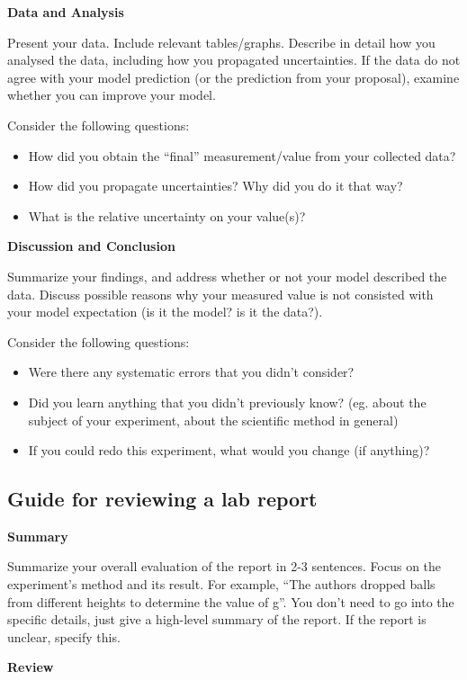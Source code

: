\textbf{Data and Analysis}

Present your data. Include relevant tables/graphs. Describe in detail how you analysed the data, including how you propagated uncertainties. If the data do not agree with your model prediction (or the prediction from your proposal), examine whether you can improve your model. 

Consider the following questions:
\begin{itemize}
\item How did you obtain the ``final'' measurement/value from your collected data? 
\item How did you propagate uncertainties? Why did you do it that way?
\item What is the relative uncertainty on your value(s)?
\end{itemize}

\textbf{Discussion and Conclusion}

Summarize your findings, and address whether or not your model described the data. Discuss possible reasons why your measured value is not consisted with your model expectation (is it the model? is it the data?).

Consider the following questions:
\begin{itemize}
\item Were there any systematic errors that you didn't consider?
\item Did you learn anything that you didn't previously know? (eg. about the subject of your experiment, about the scientific method in general)
\item If you could redo this experiment, what would you change (if anything)?
\end{itemize}

\newpage
\subsection{Guide for reviewing a lab report}
 \vspace{0.25cm}
\textbf{Summary}

Summarize your overall evaluation of the report in 2-3 sentences. Focus on the experiment's method and its result. For example, ``The authors dropped balls from different heights to determine the value of g''. You don't need to go into the specific details, just give a high-level summary of the report. If the report is unclear, specify this.

\textbf{Review}

